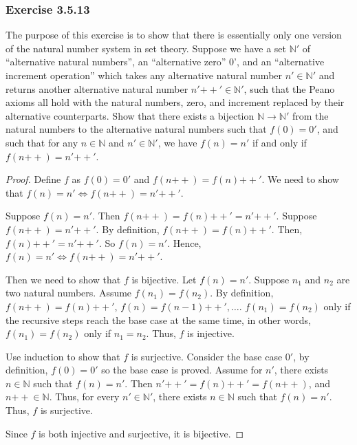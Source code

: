 \documentclass[12pt, letter]{article}
\begin{document}
\subsubsection*{Exercise 3.5.13}
The purpose of this exercise is to show that there is essentially only one version of the natural number system in set theory. Suppose we have a set $\mathbb{N}'$ of ``alternative natural numbers'', an ``alternative zero'' 0', and 
an ``alternative increment operation'' which takes any alternative natural number $n'\in\mathbb{N}'$ and returns another alternative natural number $n'\mathtt{++}'\in\mathbb{N}'$, such that the Peano axioms all hold with the natural numbers, zero, and increment replaced by their alternative counterparts.
Show that there exists a bijection $\mathbb{N}\to \mathbb{N}'$ from the natural numbers to the alternative natural numbers such that $f(0)=0'$, and such that for any $n\in\mathbb{N}$ and $n'\in\mathbb{N}'$, we have $f(n)=n'$ if and only if $f(n\mathtt{++})=n'\mathtt{++}'$.
\begin{proof}
    Define $f$ as $f(0)=0'$ and $f(n\mathtt{++})=f(n)\mathtt{++}'$. We need to show that $f(n)=n'\iff f(n\mathtt{++})=n'\mathtt{++}'$.

    Suppose $f(n)=n'$. Then $f(n\mathtt{++})=f(n)\mathtt{++}'=n'\mathtt{++}'$. Suppose $f(n\mathtt{++})=n'\mathtt{++}'$. By definition, $f(n\mathtt{++})=f(n)\mathtt{++}'$. Then, $f(n)\mathtt{++}'=n'\mathtt{++}'$. So $f(n)=n'$. Hence, $f(n)=n'\iff f(n\mathtt{++})=n'\mathtt{++}'$.

    Then we need to show that $f$ is bijective. Let $f(n)=n'$. Suppose $n_1$ and $n_2$ are two natural numbers. Assume $f(n_1)=f(n_2)$. By definition, $f(n\mathtt{++})=f(n)\mathtt{++}'$, $f(n)=f(n-1)\mathtt{++}',\dotsc$. $f(n_1)=f(n_2)$ only if the recursive steps reach the base case at the same time, in other words,
    $f(n_1)=f(n_2)$ only if $n_1=n_2$. Thus, $f$ is injective. 

    Use induction to show that $f$ is surjective. Consider the base case $0'$, by definition, $f(0)=0'$ so the base case is proved. Assume for $n'$, there exists $n\in \mathbb{N}$ such that $f(n)=n'$. Then 
    $n'\mathtt{++}'=f(n)\mathtt{++}'=f(n\mathtt{++})$, and $n\mathtt{++}\in\mathbb{N}$. Thus, for every $n'\in\mathbb{N}'$, there exists $n\in\mathbb{N}$ such that $f(n)=n'$. Thus, $f$ is surjective.

    Since $f$ is both injective and surjective, it is bijective.
\end{proof}
\end{document}
